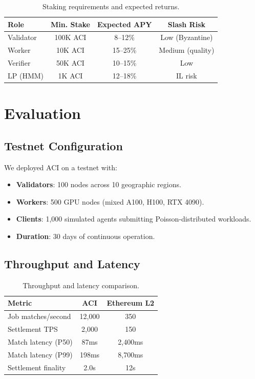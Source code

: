 \documentclass[11pt,twocolumn]{article}
\begin{document}
\begin{table}[H]
\centering
\small
\begin{tabular}{lccc}
\toprule
\textbf{Role} & \textbf{Min. Stake} & \textbf{Expected APY} & \textbf{Slash Risk} \\
\midrule
Validator & 100K ACI & 8--12\% & Low (Byzantine) \\
Worker & 10K ACI & 15--25\% & Medium (quality) \\
Verifier & 50K ACI & 10--15\% & Low \\
LP (HMM) & 1K ACI & 12--18\% & IL risk \\
\bottomrule
\end{tabular}
\caption{Staking requirements and expected returns.}
\label{tab:staking}
\end{table}

\section{Evaluation}
\label{sec:evaluation}

\subsection{Testnet Configuration}

We deployed ACI on a testnet with:

\begin{itemize}[leftmargin=1.1em]
    \item \textbf{Validators}: 100 nodes across 10 geographic regions.
    \item \textbf{Workers}: 500 GPU nodes (mixed A100, H100, RTX 4090).
    \item \textbf{Clients}: 1,000 simulated agents submitting Poisson-distributed workloads.
    \item \textbf{Duration}: 30 days of continuous operation.
\end{itemize}

\subsection{Throughput and Latency}

\begin{table}[H]
\centering
\small
\begin{tabular}{lcc}
\toprule
\textbf{Metric} & \textbf{ACI} & \textbf{Ethereum L2} \\
\midrule
Job matches/second & 12,000 & 350 \\
Settlement TPS & 2,000 & 150 \\
Match latency (P50) & 87ms & 2,400ms \\
Match latency (P99) & 198ms & 8,700ms \\
Settlement finality & 2.0s & 12s \\
\bottomrule
\end{tabular}
\caption{Throughput and latency comparison.}
\label{tab:throughput}
\end{table}
\end{document}
